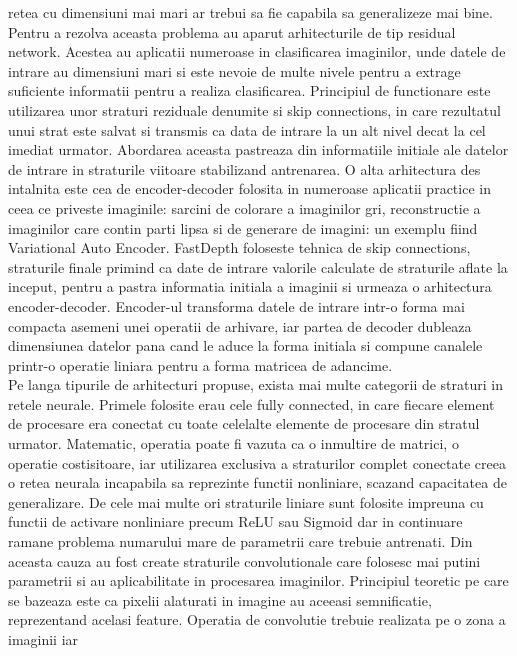 \documentclass[12pt,a4paper]{report}
\begin{document}
retea cu dimensiuni mai mari ar trebui sa fie capabila sa generalizeze mai bine.    
Pentru a rezolva aceasta problema au aparut arhitecturile de tip residual network. Acestea au 
aplicatii numeroase in clasificarea imaginilor, unde datele de intrare au dimensiuni mari
si este nevoie de multe nivele pentru a extrage suficiente informatii pentru a realiza 
clasificarea. Principiul de functionare este utilizarea unor straturi reziduale denumite si skip
connections, in care rezultatul unui strat este salvat si transmis ca data de intrare la un alt
nivel decat la cel imediat urmator. Abordarea aceasta pastreaza din informatiile initiale ale 
datelor de intrare in straturile viitoare stabilizand antrenarea. O alta arhitectura des 
intalnita este cea de encoder-decoder folosita in numeroase aplicatii practice in ceea ce 
priveste imaginile: sarcini de colorare a imaginilor gri, reconstructie a imaginilor care 
contin parti lipsa si de generare de imagini: un exemplu fiind Variational Auto Encoder.
FastDepth foloseste tehnica de skip connections, straturile finale primind ca date de intrare
valorile calculate de straturile aflate la inceput, pentru a pastra informatia initiala a 
imaginii si urmeaza o arhitectura encoder-decoder. Encoder-ul transforma datele de intrare
intr-o forma mai compacta asemeni unei operatii de arhivare, iar partea de decoder dubleaza
dimensiunea datelor pana cand le aduce la forma initiala si compune canalele printr-o operatie
liniara pentru a forma matricea de adancime. \\
Pe langa tipurile de arhitecturi propuse, exista mai multe categorii de straturi in retele neurale.
Primele folosite erau cele fully connected, in care fiecare element de procesare era conectat 
cu toate celelalte elemente de procesare din stratul urmator. Matematic, operatia poate fi vazuta 
ca o inmultire de matrici, o operatie costisitoare, iar utilizarea exclusiva a straturilor complet 
conectate creea o retea neurala incapabila sa reprezinte functii nonliniare, scazand capacitatea de
generalizare. De cele mai multe ori straturile liniare sunt folosite impreuna cu functii de
activare nonliniare precum ReLU sau Sigmoid dar in continuare ramane problema numarului mare 
de parametrii care trebuie antrenati. Din aceasta cauza au fost create straturile convolutionale
care  folosesc mai putini parametrii si au aplicabilitate in procesarea imaginilor. Principiul
teoretic pe care se bazeaza este ca pixelii alaturati in imagine au aceeasi semnificatie,
reprezentand acelasi feature. Operatia de convolutie trebuie realizata pe o zona a imaginii iar
\end{document}
